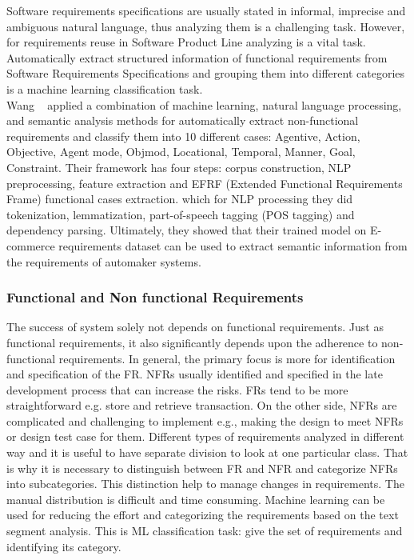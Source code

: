 Software requirements specifications are usually stated in informal, imprecise
and ambiguous natural language, thus analyzing them is a challenging task.
However, for requirements reuse in Software Product Line analyzing is a vital
task. Automatically extract structured information of functional requirements
from Software Requirements Specifications and grouping them into different
categories is a machine learning classification task\cite{7949577}. \\

Wang \etal~\cite{7949577} applied a combination of machine learning, natural
language processing, and semantic analysis methods for automatically extract
non-functional requirements and classify
them into 10 different cases:
Agentive, Action, Objective, Agent mode, Objmod, Locational, Temporal, Manner, Goal,
Constraint. Their framework has four steps: corpus construction,  NLP 
preprocessing, feature extraction and  EFRF (Extended Functional Requirements
Frame) functional cases extraction. which for NLP processing they did
tokenization,   lemmatization, part-of-speech tagging (POS  tagging) and
dependency parsing. Ultimately, they showed that their trained model on
E-commerce requirements dataset can be used to extract semantic information from
the requirements of automaker systems.

\subsubsection{Functional and Non functional Requirements}

The success of system solely not depends on functional requirements. Just as
functional requirements, it also significantly depends upon the adherence to
non-functional requirements. In general, the primary focus is more for
identification and specification of the FR.  NFRs usually identified and
specified in the late development process that can increase the risks. FRs tend
to be more straightforward e.g. store and retrieve transaction. On the other
side, NFRs are complicated and challenging to implement e.g., making the design
to meet NFRs or design test case for them. Different types of requirements
analyzed in different way and it is useful to have separate division to look at
one particular class. That is why it is necessary to distinguish between FR and
NFR and categorize NFRs into subcategories. This distinction help to manage
changes in requirements. The manual distribution is difficult and time
consuming. Machine learning can be used for reducing the effort and categorizing
the requirements based on the text segment analysis. This is ML classification
task: give the set of requirements and identifying its category. \\

